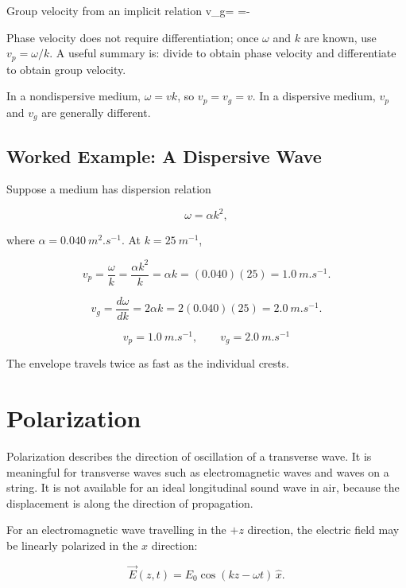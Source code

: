 \documentclass{studentnotes}
\begin{document}
\begin{namedformula}{Group velocity from an implicit relation}
    v_g=
       =-
\end{namedformula}

Phase velocity does not require differentiation; once \(\omega\) and \(k\) are
known, use \(v_p=\omega/k\). A useful summary is: divide to obtain phase velocity
and differentiate to obtain group velocity.

\begin{importantnote}
    In a nondispersive medium, \(\omega=vk\), so \(v_p=v_g=v\). In a dispersive
    medium, \(v_p\) and \(v_g\) are generally different.
\end{importantnote}

\subsection{Worked Example: A Dispersive Wave}

Suppose a medium has dispersion relation

\[
    \omega=\alpha k^2,
\]

where \(\alpha=\SI{0.040}{m^2.s^{-1}}\). At \(k=\SI{25}{m^{-1}}\),

\[
    v_p=\frac{\omega}{k}=\frac{\alpha k^2}{k}=\alpha k
       =(0.040)(25)=\SI{1.0}{m.s^{-1}}.
\]

\[
    v_g=\frac{d\omega}{dk}=2\alpha k
       =2(0.040)(25)=\SI{2.0}{m.s^{-1}}.
\]

\[
    \boxed{v_p=\SI{1.0}{m.s^{-1}},
    \qquad
    v_g=\SI{2.0}{m.s^{-1}}}
\]

The envelope travels twice as fast as the individual crests.

\section{Polarization}

Polarization describes the direction of oscillation of a transverse wave. It is
meaningful for transverse waves such as electromagnetic waves and waves on a
string. It is not available for an ideal longitudinal sound wave in air, because
the displacement is along the direction of propagation.

For an electromagnetic wave travelling in the \(+z\) direction, the electric
field may be linearly polarized in the \(x\) direction:

\[
    \vec{E}(z,t)=E_0\cos(kz-\omega t)\,\hat{x}.
\]
\end{document}
